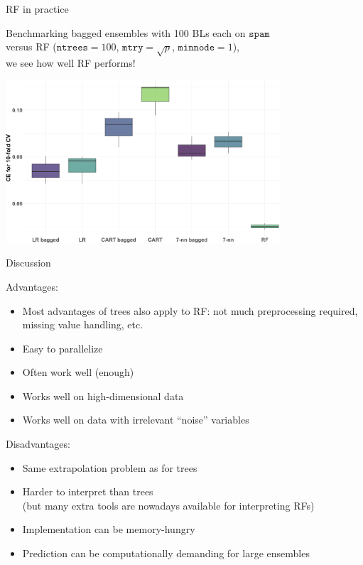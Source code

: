 \documentclass[11pt,compress,t,notes=noshow, xcolor=table]{beamer}
\begin{document}
\begin{vbframe}{RF in practice}

Benchmarking bagged ensembles with 100 BLs each on $\texttt{spam}$ \\
versus RF ($\texttt{ntrees} = 100$, $\texttt{mtry} = \sqrt{p}$, $\texttt{minnode} = 1$), \\
we see how well RF performs!

\begin{center}
\includegraphics[width=290pt]{figure/bagging-bench_RF.png}
\end{center}

\end{vbframe}

\begin{vbframe}{Discussion}

Advantages:
\begin{itemize}
  \item Most advantages of trees also apply to RF: not much preprocessing required, missing value handling, etc.
  \item Easy to parallelize
  \item Often work well (enough)
  \item Works well on high-dimensional data
  \item Works well on data with irrelevant \enquote{noise} variables
\end{itemize}

\lz

Disadvantages:
\begin{itemize}
  \item Same extrapolation problem as for trees
  \item Harder to interpret than trees \\
    (but many extra tools are nowadays
    available for interpreting RFs)
  \item Implementation can be memory-hungry
  \item Prediction can be computationally demanding for large ensembles
\end{itemize}

\end{vbframe}

\endlecture
\end{document}
